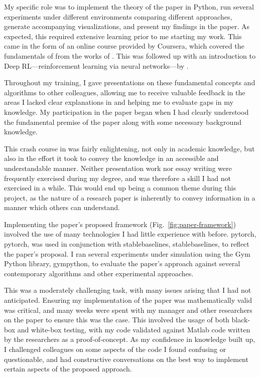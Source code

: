 My specific role was to implement the theory of the paper in Python, run several experiments under
different environments comparing different approaches, generate accompanying visualizations, and
present my findings in the paper. As expected, this required extensive learning prior to me starting
my work. This came in the form of an online course provided by Coursera, which covered the
fundamentals of  from the works of \textcite{sutton2018reinforcement}. This was followed up
with an introduction to Deep RL---reinforcement learning via neural networks---by
\textcite{openai2018spinningup}.

Throughout my training, I gave presentations on these fundamental concepts and algorithms to other
colleagues, allowing me to receive valuable feedback in the areas I lacked clear explanations in and
helping me to evaluate gaps in my knowledge. My participation in the paper began when I had clearly
understood the fundamental premise of the paper along with some necessary background
knowledge.

This crash course in  was fairly enlightening, not only in academic knowledge, but also in
the effort it took to convey the knowledge in an accessible and understandable manner. Neither
presentation work nor essay writing were frequently exercised during my degree, and was therefore a
skill I had not exercised in a while. This would end up being a common theme during this project, as
the nature of a research paper is inherently to convey information in a manner which others can
understand.

Implementing the paper's proposed framework (Fig.~\ref{fig:paper-framework}) involved the
use of many technologies I had little experience with before. \gls*{pytorch}, \glsdesc*{pytorch},
was used in conjunction with \gls*{stablebaselines}, \glsdesc*{stablebaselines}, to reflect the
paper's proposal. I ran several experiments under simulation using the Gym Python library,
\glsdesc*{gympython}, to evaluate the paper's approach against several contemporary 
algorithms and other experimental approaches.

This was a moderately challenging task, with many issues arising that I had not anticipated.
Ensuring my implementation of the paper was mathematically valid was critical, and many weeks were
spent with my manager and other researchers on the paper to ensure this was the case. This involved
the usage of both black-box and white-box testing, with my code validated against Matlab code
written by the researchers as a proof-of-concept. As my confidence in knowledge built up, I
challenged colleagues on some aspects of the code I found confusing or questionable, and had
constructive conversations on the best way to implement certain aspects of the proposed approach.

